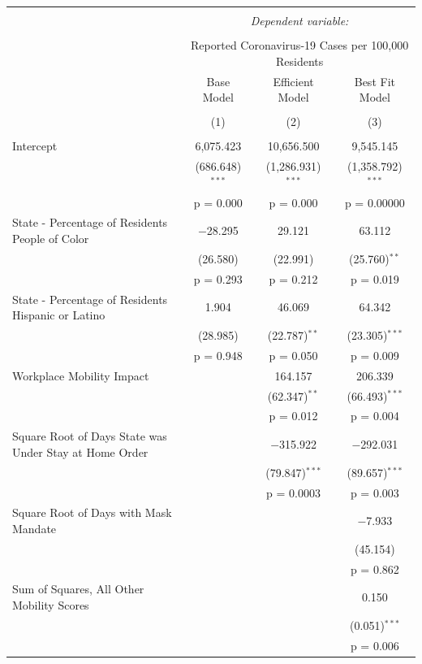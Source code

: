 \documentclass[
]{article}
\begin{document}
\begingroup 
\footnotesize 
\begin{tabular}{@{\extracolsep{1pt}}lccc} 
\\[-1.8ex]\hline 
\hline \\[-1.8ex] 
 & \multicolumn{3}{c}{\textit{Dependent variable:}} \\ 
\cline{2-4} 
\\[-1.8ex] & \multicolumn{3}{c}{Reported Coronavirus-19 Cases per 100,000 Residents} \\ 
 & Base Model & Efficient Model & Best Fit Model \\ 
\\[-1.8ex] & (1) & (2) & (3)\\ 
\hline \\[-1.8ex] 
 Intercept & 6,075.423 & 10,656.500 & 9,545.145 \\ 
  & (686.648)$^{***}$ & (1,286.931)$^{***}$ & (1,358.792)$^{***}$ \\ 
  & p = 0.000 & p = 0.000 & p = 0.00000 \\ 
  State - Percentage of Residents People of Color & $-$28.295 & 29.121 & 63.112 \\ 
  & (26.580) & (22.991) & (25.760)$^{**}$ \\ 
  & p = 0.293 & p = 0.212 & p = 0.019 \\ 
  State - Percentage of Residents Hispanic or Latino & 1.904 & 46.069 & 64.342 \\ 
  & (28.985) & (22.787)$^{**}$ & (23.305)$^{***}$ \\ 
  & p = 0.948 & p = 0.050 & p = 0.009 \\ 
  Workplace Mobility Impact &  & 164.157 & 206.339 \\ 
  &  & (62.347)$^{**}$ & (66.493)$^{***}$ \\ 
  &  & p = 0.012 & p = 0.004 \\ 
  Square Root of Days State was Under Stay at Home Order &  & $-$315.922 & $-$292.031 \\ 
  &  & (79.847)$^{***}$ & (89.657)$^{***}$ \\ 
  &  & p = 0.0003 & p = 0.003 \\ 
  Square Root of Days with Mask Mandate &  &  & $-$7.933 \\ 
  &  &  & (45.154) \\ 
  &  &  & p = 0.862 \\ 
  Sum of Squares, All Other Mobility Scores &  &  & 0.150 \\ 
  &  &  & (0.051)$^{***}$ \\ 
  &  &  & p = 0.006 \\ 

\end{tabular}
\end{document}
